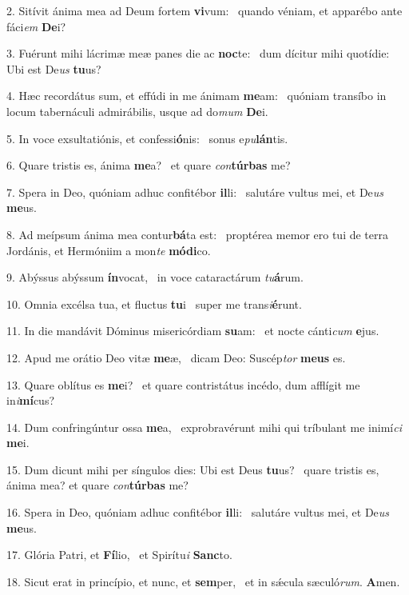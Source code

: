 2. Sitívit ánima mea ad Deum fortem \textbf{vi}vum: \ast\  quando véniam, et apparébo ante fáci\textit{em} \textbf{De}i?\

3. Fuérunt mihi lácrimæ meæ panes die ac \textbf{noc}te: \ast\  dum dícitur mihi quotídie: Ubi est De\textit{us} \textbf{tu}us?\

4. Hæc recordátus sum, et effúdi in me ánimam \textbf{me}am: \ast\  quóniam transíbo in locum tabernáculi admirábilis, usque ad do\textit{mum} \textbf{De}i.\

5. In voce exsultatiónis, et confessi\textbf{ó}nis: \ast\  sonus e\textit{pu}\textbf{lán}tis.\

6. Quare tristis es, ánima \textbf{me}a? \ast\  et quare \textit{con}\textbf{túr}\textbf{bas} me?\

7. Spera in Deo, quóniam adhuc confitébor \textbf{il}li: \ast\  salutáre vultus mei, et De\textit{us} \textbf{me}us.\

8. Ad meípsum ánima mea contur\textbf{bá}ta est: \ast\  proptérea memor ero tui de terra Jordánis, et Hermóniim a mon\textit{te} \textbf{mó}\textbf{di}co.\

9. Abýssus abýssum \textbf{ín}vocat, \ast\  in voce cataractárum \textit{tu}\textbf{á}rum.\

10. Omnia excélsa tua, et fluctus \textbf{tu}i \ast\  super me trans\textit{i}\textbf{é}runt.\

11. In die mandávit Dóminus misericórdiam \textbf{su}am: \ast\  et nocte cánti\textit{cum} \textbf{e}jus.\

12. Apud me orátio Deo vitæ \textbf{me}æ, \ast\  dicam Deo: Suscép\textit{tor} \textbf{me}\textbf{us} es.\

13. Quare oblítus es \textbf{me}i? \ast\  et quare contristátus incédo, dum afflígit me in\textit{i}\textbf{mí}cus?\

14. Dum confringúntur ossa \textbf{me}a, \ast\  exprobravérunt mihi qui tríbulant me inimí\textit{ci} \textbf{me}i.\

15. Dum dicunt mihi per síngulos dies: Ubi est Deus \textbf{tu}us? \ast\  quare tristis es, ánima mea? et quare \textit{con}\textbf{túr}\textbf{bas} me?\

16. Spera in Deo, quóniam adhuc confitébor \textbf{il}li: \ast\  salutáre vultus mei, et De\textit{us} \textbf{me}us.\

17. Glória Patri, et \textbf{Fí}lio, \ast\  et Spirítu\textit{i} \textbf{Sanc}to.\

18. Sicut erat in princípio, et nunc, et \textbf{sem}per, \ast\  et in sǽcula sæculó\textit{rum}. \textbf{A}men.\

